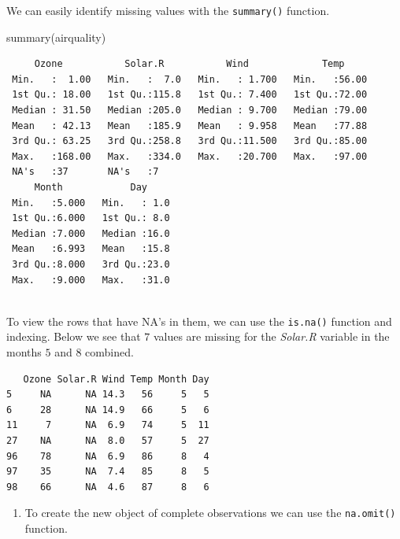 \documentclass[
  letterpaper,
  DIV=11,
  numbers=noendperiod]{scrreprt}
\newenvironment{Shaded}{\begin{snugshade}}{\end{snugshade}}
\newcommand{\FunctionTok}[1]{\textcolor[rgb]{0.28,0.35,0.67}{#1}}
\newcommand{\NormalTok}[1]{\textcolor[rgb]{0.00,0.23,0.31}{#1}}
\newcommand{\SpecialCharTok}[1]{\textcolor[rgb]{0.37,0.37,0.37}{#1}}
\providecommand{\tightlist}{%
  \setlength{\itemsep}{0pt}\setlength{\parskip}{0pt}}\usepackage{longtable,booktabs,array}
\begin{document}
We can easily identify missing values with the \texttt{summary()}
function.

\begin{Shaded}
\begin{Highlighting}[numbers=left,,]
\FunctionTok{summary}\NormalTok{(airquality)}
\end{Highlighting}
\end{Shaded}

\begin{verbatim}
     Ozone           Solar.R           Wind             Temp      
 Min.   :  1.00   Min.   :  7.0   Min.   : 1.700   Min.   :56.00  
 1st Qu.: 18.00   1st Qu.:115.8   1st Qu.: 7.400   1st Qu.:72.00  
 Median : 31.50   Median :205.0   Median : 9.700   Median :79.00  
 Mean   : 42.13   Mean   :185.9   Mean   : 9.958   Mean   :77.88  
 3rd Qu.: 63.25   3rd Qu.:258.8   3rd Qu.:11.500   3rd Qu.:85.00  
 Max.   :168.00   Max.   :334.0   Max.   :20.700   Max.   :97.00  
 NA's   :37       NA's   :7                                       
     Month            Day      
 Min.   :5.000   Min.   : 1.0  
 1st Qu.:6.000   1st Qu.: 8.0  
 Median :7.000   Median :16.0  
 Mean   :6.993   Mean   :15.8  
 3rd Qu.:8.000   3rd Qu.:23.0  
 Max.   :9.000   Max.   :31.0  
                               
\end{verbatim}

To view the rows that have NA's in them, we can use the \texttt{is.na()}
function and indexing. Below we see that \(7\) values are missing for
the \emph{Solar.R} variable in the months \(5\) and \(8\) combined.

\begin{Shaded}
\end{Shaded}

\begin{verbatim}
   Ozone Solar.R Wind Temp Month Day
5     NA      NA 14.3   56     5   5
6     28      NA 14.9   66     5   6
11     7      NA  6.9   74     5  11
27    NA      NA  8.0   57     5  27
96    78      NA  6.9   86     8   4
97    35      NA  7.4   85     8   5
98    66      NA  4.6   87     8   6
\end{verbatim}

\begin{blackbox}

\begin{enumerate}
\def\labelenumi{\arabic{enumi}.}
\setcounter{enumi}{3}
\tightlist
\item
  To create the new object of complete observations we can use the
  \texttt{na.omit()} function.
\end{enumerate}

\end{blackbox}
\end{document}
